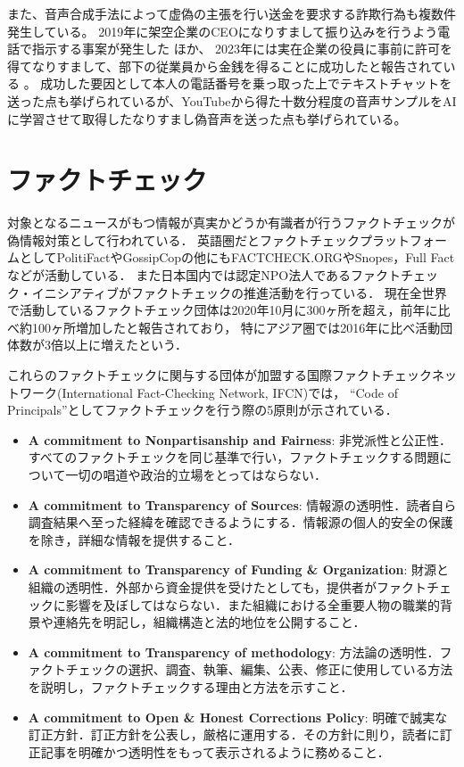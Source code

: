 また、音声合成手法によって虚偽の主張を行い送金を要求する詐欺行為も複数件発生している。
2019年に架空企業のCEOになりすまして振り込みを行うよう電話で指示する事案が発生した \cite{Stupp_2019}ほか、
2023年には実在企業の役員に事前に許可を得てなりすまして、部下の従業員から金銭を得ることに成功したと報告されている \cite{Bunn_2023}。
成功した要因として本人の電話番号を乗っ取った上でテキストチャットを送った点も挙げられているが、YouTubeから得た十数分程度の音声サンプルをAIに学習させて取得したなりすまし偽音声を送った点も挙げられている。


\section{ファクトチェック}
対象となるニュースがもつ情報が真実かどうか有識者が行うファクトチェックが偽情報対策として行われている．
英語圏だとファクトチェックプラットフォームとしてPolitiFactやGossipCopの他にもFACTCHECK.ORGやSnopes，Full Factなどが活動している．
また日本国内では認定NPO法人であるファクトチェック・イニシアティブがファクトチェックの推進活動を行っている．
現在全世界で活動しているファクトチェック団体は2020年10月に300ヶ所を超え，前年に比べ約100ヶ所増加したと報告されており，
特にアジア圏では2016年に比べ活動団体数が3倍以上に増えたという\cite{stencel_luther_2020}．

これらのファクトチェックに関与する団体が加盟する国際ファクトチェックネットワーク(International Fact-Checking Network, IFCN)では，
``Code of Principals''としてファクトチェックを行う際の5原則が示されている\cite{IFCN,fij}．

\begin{itemize}
    \item \textbf{A commitment to Nonpartisanship and Fairness}: 非党派性と公正性．すべてのファクトチェックを同じ基準で行い，ファクトチェックする問題について一切の唱道や政治的立場をとってはならない．
    \item \textbf{A commitment to Transparency of Sources}: 情報源の透明性．読者自ら調査結果へ至った経緯を確認できるようにする．情報源の個人的安全の保護を除き，詳細な情報を提供すること．
    \item \textbf{A commitment to Transparency of Funding \& Organization}: 財源と組織の透明性．外部から資金提供を受けたとしても，提供者がファクトチェックに影響を及ぼしてはならない．また組織における全重要人物の職業的背景や連絡先を明記し，組織構造と法的地位を公開すること．
    \item \textbf{A commitment to Transparency of methodology}: 方法論の透明性．ファクトチェックの選択、調査、執筆、編集、公表、修正に使用している方法を説明し，ファクトチェックする理由と方法を示すこと．
    \item \textbf{A commitment to Open \& Honest Corrections Policy}: 明確で誠実な訂正方針．訂正方針を公表し，厳格に運用する．その方針に則り，読者に訂正記事を明確かつ透明性をもって表示されるように務めること．
\end{itemize}

